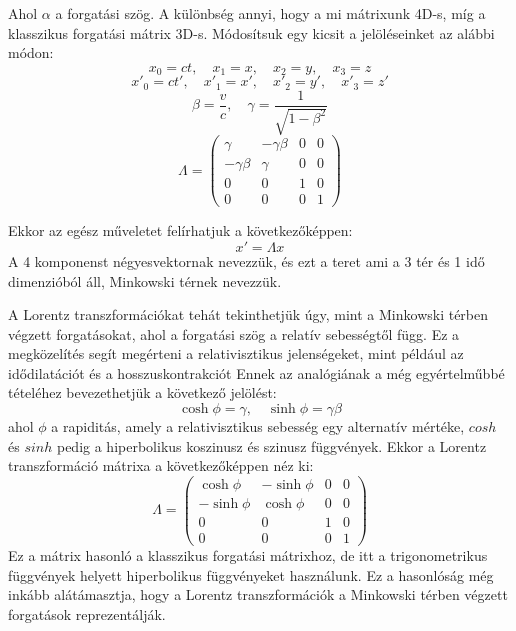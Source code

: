 \documentclass[../main.tex]{subfiles}
\begin{document}
Ahol $\alpha$ a forgatási szög. A különbség annyi, hogy a mi mátrixunk 4D-s, míg a klasszikus forgatási mátrix 3D-s.
Módosítsuk egy kicsit a jelöléseinket az alábbi módon:
\begin{equation}
    x_0 = ct, \quad x_1 = x, \quad x_2 = y, \quad x_3 = z
\end{equation}
\begin{equation}
    x'_0 = ct', \quad x'_1 = x', \quad x'_2 = y', \quad x'_3 = z'
\end{equation}
\begin{equation}
    \beta = \frac{v}{c}, \quad \gamma = \frac{1}{\sqrt{1 - \beta^2}}
\end{equation}
\begin{equation}
    \Lambda =
    \begin{pmatrix}
        \gamma & -\gamma \beta & 0 & 0 \\
        -\gamma \beta & \gamma & 0 & 0 \\
        0 & 0 & 1 & 0 \\
        0 & 0 & 0 & 1
    \end{pmatrix}
\end{equation}

Ekkor az egész műveletet felírhatjuk a következőképpen:
\begin{equation}
    x' = \Lambda x
\end{equation}
A 4 komponenst négyesvektornak nevezzük, és ezt a teret ami a 3 tér és 1 idő dimenzióból áll, Minkowski térnek nevezzük.

A Lorentz transzformációkat tehát tekinthetjük úgy, mint a Minkowski térben végzett forgatásokat, ahol a forgatási szög a relatív sebességtől függ. Ez a megközelítés segít megérteni a relativisztikus jelenségeket, mint például az idődilatációt és a hosszuskontrakciót
Ennek az analógiának a még egyértelműbbé tételéhez bevezethetjük a következő jelölést:
\begin{equation}
    \cosh \phi = \gamma, \quad \sinh \phi = \gamma \beta
\end{equation}
ahol $\phi$ a rapiditás, amely a relativisztikus sebesség egy alternatív mértéke, $cosh$ és $sinh$ pedig a hiperbolikus koszinusz és szinusz függvények. Ekkor a Lorentz transzformáció mátrixa a következőképpen néz ki:
\begin{equation}
    \Lambda =
    \begin{pmatrix}
        \cosh \phi & -\sinh \phi & 0 & 0 \\
        -\sinh \phi & \cosh \phi & 0 & 0 \\
        0 & 0 & 1 & 0 \\
        0 & 0 & 0 & 1
    \end{pmatrix}
\end{equation}
Ez a mátrix hasonló a klasszikus forgatási mátrixhoz, de itt a trigonometrikus függvények helyett hiperbolikus függvényeket használunk. Ez a hasonlóság még inkább alátámasztja,
hogy a Lorentz transzformációk a Minkowski térben végzett forgatások reprezentálják.
\end{document}
